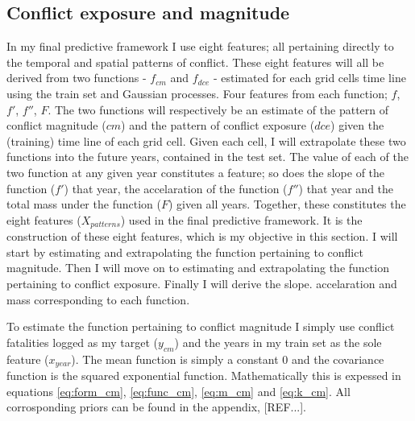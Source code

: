 \documentclass[a4paper]{article}
\begin{document}
\subsection{Conflict exposure and magnitude}


In my final predictive framework I use eight features; all pertaining directly to the temporal and spatial patterns of conflict. These eight features will all be derived from two functions - $f_{cm}$ and $f_{dce}$ - estimated for each grid cells time line using the train set and Gaussian processes. Four features from each function; $f$, $f'$, $f''$, $F$. The two functions will respectively be an estimate of the pattern of conflict magnitude ($cm$) and the pattern of conflict exposure ($dce$) given the (training) time line of each grid cell. Given each cell, I will extrapolate these two functions into the future years, contained in the test set. The value of each of the two function at any given year constitutes a feature; so does the slope of the function ($f'$) that year, the accelaration of the function ($f''$) that year and the total mass under the function ($F$) given all years. Together, these constitutes the eight features ($X_{patterns}$) used in the final predictive framework. It is the construction of these eight features, which is my objective in this section. I will start by estimating and extrapolating the function pertaining to conflict magnitude. Then I will move on to estimating and extrapolating the function pertaining to conflict exposure. Finally I will derive the slope. accelaration and mass corresponding to each function.\par

To estimate the function pertaining to conflict magnitude I simply use conflict fatalities logged as my target ($y_{cm}$) and the years in my train set as the sole feature ($x_{year}$). The mean function is simply a constant $0$ and the covariance function is the squared exponential function. Mathematically this is expessed in equations \ref{eq:form_cm}, \ref{eq:func_cm}, \ref{eq:m_cm} and \ref{eq:k_cm}. All corrosponding priors can be found in the appendix, [REF...].\par
\end{document}
